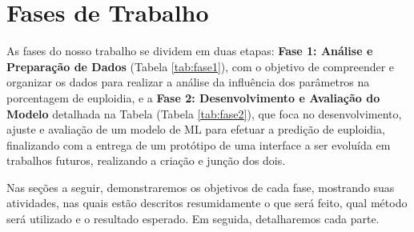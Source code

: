 \section{Fases de Trabalho}

As fases do nosso trabalho se dividem em duas etapas: \textbf{Fase 1: Análise e Preparação de Dados} (Tabela \ref{tab:fase1}), com o objetivo de compreender e organizar os dados para realizar a análise da influência dos parâmetros na porcentagem de euploidia, e a \textbf{Fase 2: Desenvolvimento e Avaliação do Modelo} detalhada na Tabela (Tabela \ref{tab:fase2}), que foca no desenvolvimento, ajuste e avaliação de um modelo de ML para efetuar a predição de euploidia, finalizando com a entrega de um protótipo de uma interface a ser evoluída em trabalhos futuros, realizando a criação e junção dos dois.

Nas seções a seguir, demonstraremos os objetivos de cada fase, mostrando suas atividades, nas quais estão descritos resumidamente o que será feito, qual método será utilizado e o resultado esperado. Em seguida, detalharemos cada parte.

